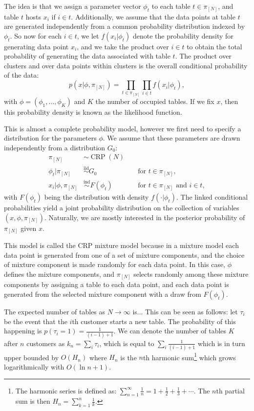 The idea is that we assign a parameter vector $\phi_t$ to each table $t\in\pi_{[N]}$, and table $t$ hosts $x_i$ if $i\in t$. Additionally, we assume that the data points at table $t$ are generated independently from a common probability distribution indexed by $\phi_t$. So now for each $i\in t$, we let $f(x_i|\phi_t)$ denote the probability density for generating data point $x_i$, and we take the product over $i\in t$ to obtain the total probability of generating the data associated with table $t$. The product over clusters and over data points within clusters is the overall conditional probability of the data:
\begin{equation}
	p(x|\phi,\pi_{[N]}) = \prod_{t\in\pi_{[N]}}\prod_{i\in t} f(x_i|\phi_t),
\end{equation}
with $\phi=(\phi_1,\ldots,\phi_K)$ and $K$ the number of occupied tables. If we fix $x$, then this probability density is known as the likelihood function.

This is almost a complete probability model, however we first need to specify a distribution for the parameters $\phi$. We assume that these parameters are drawn independently from a distribution $G_0$:
\begin{align}
	\pi_{[N]} &\sim \operatorname{CRP}(N) \\
    \phi_t | \pi_{[N]} &\overset{\text{iid}}{\sim} G_0 && \text{ for }t\in\pi_{[N]}, \\
    x_i|\phi,\pi_{[N]} &\overset{\text{ind}}{\sim} F(\phi_t) && \text{ for }t\in\pi_{[N]}\text{ and }i\in t,
\end{align}
with $F(\phi_t)$ being the distribution with density $f(\cdot|\phi_t)$. The linked conditional probabilities yield a joint probability distribution on the collection of variables $(x,\phi,\pi_{[N]})$. Naturally, we are mostly interested in the posterior probability of $\pi_{[N]}$ given $x$.

This model is called the CRP mixture model because in a mixture model each data point is generated from one of a set of mixture components, and the choice of mixture component is made randomly for each data point. In this case, $\phi$ defines the mixture components, and $\pi_{[N]}$ selects randomly among these mixture components by assigning a table to each data point, and each data point is generated from the selected mixture component with a draw from $F(\phi_t)$.

The expected number of tables as $N \rightarrow \infty$ is... This can be seen as follows: let $\tau_i$ be the event that the $i$th customer starts a new table. The probability of this happening is $p(\tau_i = 1) = \frac{1}{(i-1)+1}$. We can denote the number of tables $K$ after $n$ customers as $k_n = \sum_i \tau_i$, which is equal to $\sum_i \frac{1}{(i-1)+1}$ which is in turn upper bounded by $O(H_n)$ where $H_n$ is the $n$th harmonic sum\footnote{The harmonic series is defined as: $\sum_{n=1}^\infty \frac{1}{n} = 1 + \frac{1}{2} + \frac{1}{3} + \cdots$. The $n$th partial sum is then $H_n=\sum_{k=1}^n \frac{1}{k}$.} which grows logarithmically with $O(\ln n+1)$. 

